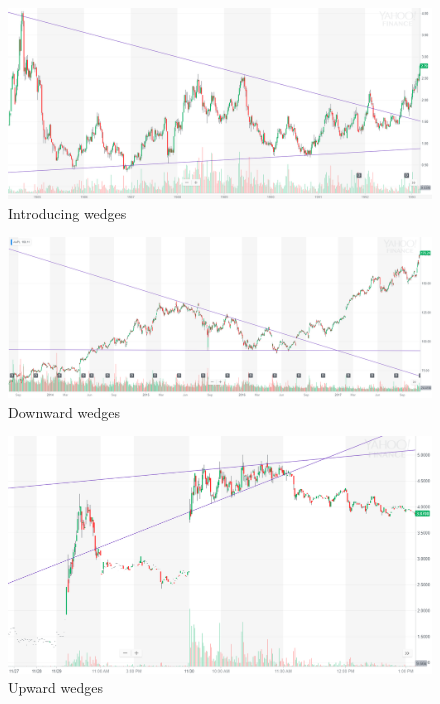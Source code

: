 \documentclass{article}
\begin{document}
\vspace{10pt}

\begin{figure}[!htb]
    \centering
    \includegraphics[width=\textwidth]{imgs/45.png}
    \caption{Introducing wedges}
\end{figure}

\vspace{10pt}

\begin{figure}[!htb]
    \centering
    \includegraphics[width=\textwidth]{imgs/46.png}
    \caption{Downward wedges}
\end{figure}

\vspace{10pt}

\begin{figure}[!htb]
    \centering
    \includegraphics[width=\textwidth]{imgs/47.png}
    \caption{Upward wedges}
\end{figure}
\end{document}
